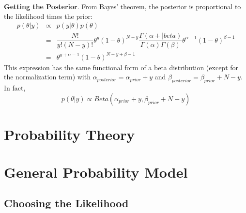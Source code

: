 \begin{example}
    \textbf{Getting the Posterior}. From  Bayes' theorem, the posterior is proportional to the likelihood times the prior:
    \begin{equation*}
        \begin{array}{rcl}
            p(\theta|y)&\propto&p(y|\theta)p(\theta)\\
                       &=&\dfrac{N!}{y!(N-y)!}\theta^y(1-\theta)^{N-y}\dfrac{\Gamma(\alpha+|beta)}{\Gamma(\alpha)\Gamma(\beta)}\theta^{\alpha-1}(1-\theta)^{\beta-1}\\
                       &=&\theta^{y+\alpha-1}(1-\theta)^{N-y+\beta-1}
        \end{array}
    \end{equation*}
    This expression has the same functional form of a beta distribution (except for the normalization term) with $\alpha_{posterior}=\alpha_{prior}+y$ and $\beta_{posterior}=\beta_{prior}+N-y$. In fact,
    $$p(\theta|y)\propto Beta(\alpha_{prior}+y, \beta_{prior}+N-y)$$
\end{example}

\section{Probability Theory}

\section{General Probability Model}

\subsection{Choosing the Likelihood}

\clearpage
\printbibliography[segment=\therefsegment,heading=subbibintoc]